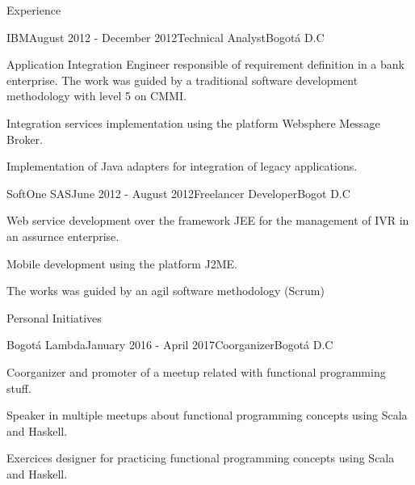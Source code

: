 \documentclass[spanish]{resume}
\begin{document}
\begin{rSection}{Experience}

\begin{rSubsection}{IBM}{August 2012 - December 2012}{Technical Analyst}{Bogot\'a D.C}
\item Application Integration Engineer responsible of requirement definition in a bank enterprise. The work was guided by a traditional software development methodology with level 5 on CMMI.
\item Integration services implementation using the platform Websphere Message Broker.
\item Implementation of Java adapters for integration of legacy applications.
\end{rSubsection}


\begin{rSubsection}{SoftOne SAS}{June 2012 - August 2012}{Freelancer Developer}{Bogot D.C}
\item Web service development over the framework JEE for the management of IVR in an assurnce enterprise.
\item Mobile development using the platform J2ME.
\item The works was guided by an agil software methodology (Scrum)
\end{rSubsection}

\end{rSection}

\begin{rSection}{Personal Initiatives}

\begin{rSubsection}{Bogot\'a Lambda}{January 2016 - April 2017}{Coorganizer}{Bogot\'a D.C}
\item Coorganizer and promoter of a meetup related with functional programming stuff.
\item Speaker in multiple meetups about functional programming concepts using Scala and Haskell.
\item Exercices designer for practicing functional programming concepts using Scala and Haskell.
\end{rSubsection}

\end{rSection}
\end{document}
